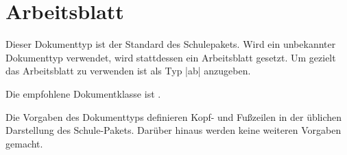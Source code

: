 \section{Arbeitsblatt}
\label{typ:ab}
Dieser Dokumenttyp ist der Standard des Schulepakets. Wird ein unbekannter Dokumenttyp verwendet, wird stattdessen ein Arbeitsblatt gesetzt. Um gezielt das Arbeitsblatt zu verwenden ist als Typ \verbcode|ab| anzugeben.

Die empfohlene Dokumentklasse ist .

Die Vorgaben des Dokumenttyps definieren Kopf- und Fußzeilen in der üblichen Darstellung des Schule-Pakets. Darüber hinaus werden keine weiteren Vorgaben gemacht.


%
%
